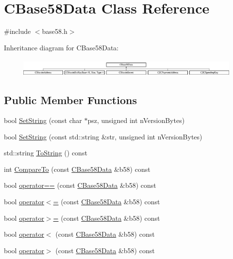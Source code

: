 \hypertarget{class_c_base58_data}{}\section{C\+Base58\+Data Class Reference}
\label{class_c_base58_data}


{\ttfamily \#include $<$base58.\+h$>$}

Inheritance diagram for C\+Base58\+Data\+:\begin{figure}[H]
\begin{center}
\leavevmode
\includegraphics[height=0.949153cm]{class_c_base58_data}
\end{center}
\end{figure}
\subsection*{Public Member Functions}
\begin{DoxyCompactItemize}
\item 
bool \mbox{\hyperlink{class_c_base58_data_ae4aa0c0eca8c691ab9516a1596cb9a0a}{Set\+String}} (const char $\ast$psz, unsigned int n\+Version\+Bytes)
\item 
bool \mbox{\hyperlink{class_c_base58_data_a495bf25426b4d24712828f5c9e9dda53}{Set\+String}} (const std\+::string \&str, unsigned int n\+Version\+Bytes)
\item 
std\+::string \mbox{\hyperlink{class_c_base58_data_a7dc91af403ca02694b3247b15604e220}{To\+String}} () const
\item 
int \mbox{\hyperlink{class_c_base58_data_ad89d6bd7afa8d831dffce12803c5f58d}{Compare\+To}} (const \mbox{\hyperlink{class_c_base58_data}{C\+Base58\+Data}} \&b58) const
\item 
bool \mbox{\hyperlink{class_c_base58_data_a2e7a634c3a008adf3f74d72ed9dbd68c}{operator==}} (const \mbox{\hyperlink{class_c_base58_data}{C\+Base58\+Data}} \&b58) const
\item 
bool \mbox{\hyperlink{class_c_base58_data_a1d99c2d0a82cbe648ba2a99e41386486}{operator$<$=}} (const \mbox{\hyperlink{class_c_base58_data}{C\+Base58\+Data}} \&b58) const
\item 
bool \mbox{\hyperlink{class_c_base58_data_a0cac1805398e2b09a498ba884c7a0057}{operator$>$=}} (const \mbox{\hyperlink{class_c_base58_data}{C\+Base58\+Data}} \&b58) const
\item 
bool \mbox{\hyperlink{class_c_base58_data_a7377c5628c43551ca22af1c0dfbaebae}{operator$<$}} (const \mbox{\hyperlink{class_c_base58_data}{C\+Base58\+Data}} \&b58) const
\item 
bool \mbox{\hyperlink{class_c_base58_data_a7d8052eacc8de55a0f4ec91306dfbec3}{operator$>$}} (const \mbox{\hyperlink{class_c_base58_data}{C\+Base58\+Data}} \&b58) const
\end{DoxyCompactItemize}

